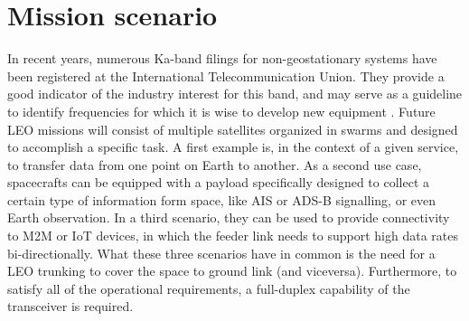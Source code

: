 \documentclass[conference,10pt,a4paper]{IEEEtran}%
\begin{document}
\section{Mission scenario}
\label{sec:mis-sce}
In recent years, numerous Ka-band filings for non-geostationary systems have been registered at the International Telecommunication Union.
They provide a good indicator of the industry interest for this band, and may serve as a guideline to identify frequencies for which it is wise to develop new equipment \cite{ioag2016}.
Future LEO missions will consist of multiple satellites organized in swarms and designed to accomplish a specific task.
A first example is, in the context of a given service, to transfer data from one point on Earth to another.
As a second use case, spacecrafts can be equipped with a payload specifically designed to collect a certain type of information form space, like AIS or ADS-B signalling, or even Earth observation.
In a third scenario, they can be used to provide connectivity to M2M or IoT devices, in which the feeder link needs to support high data rates bi-directionally.
What these three scenarios have in common is the need for a LEO trunking to cover the space to ground link (and viceversa).
Furthermore, to satisfy all of the operational requirements, a full-duplex capability of the transceiver is required.
\end{document}
